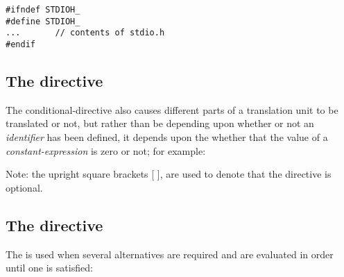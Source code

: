 \begin{production}
\begin{verbatim} 
#ifndef STDIOH_
#define STDIOH_
...       // contents of stdio.h 
#endif
\end{verbatim}
\end{production}

\subsection{The  directive}   
   
The conditional-directive  also causes different parts
of a translation unit to be translated or not, but rather than be
depending upon whether or not an {\it identifier} has been defined, it
depends upon the whether that the value of a {\it constant-expression} is
zero or not; for example:

\begin{production}
\end{production}

Note: the upright square brackets [ ], are used to denote that the
 directive is optional.

\subsection{The  directive}
\label{sec:elif} 
The  is used when several alternatives are required and 
are evaluated in order until one is satisfied:
\begin{production}
\end{production}


